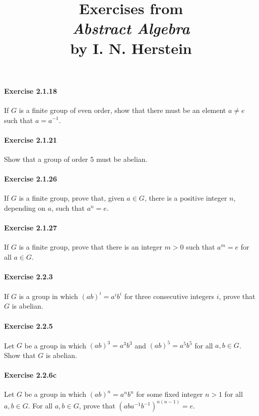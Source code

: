 \documentclass{article}
\title{\textbf{
Exercises from \\
\textit{Abstract Algebra} \\
by I. N. Herstein
}}
\date{}
\begin{document}
\maketitle

\paragraph{Exercise 2.1.18} If $G$ is a finite group of even order, show that there must be an element $a \neq e$ such that $a=a^{-1}$.

\paragraph{Exercise 2.1.21} Show that a group of order 5 must be abelian.

\paragraph{Exercise 2.1.26} If $G$ is a finite group, prove that, given $a \in G$, there is a positive integer $n$, depending on $a$, such that $a^n = e$.

\paragraph{Exercise 2.1.27} If $G$ is a finite group, prove that there is an integer $m > 0$ such that $a^m = e$ for all $a \in G$.

\paragraph{Exercise 2.2.3} If $G$ is a group in which $(a b)^{i}=a^{i} b^{i}$ for three consecutive integers $i$, prove that $G$ is abelian.

\paragraph{Exercise 2.2.5} Let $G$ be a group in which $(a b)^{3}=a^{3} b^{3}$ and $(a b)^{5}=a^{5} b^{5}$ for all $a, b \in G$. Show that $G$ is abelian.

\paragraph{Exercise 2.2.6c} Let $G$ be a group in which $(a b)^{n}=a^{n} b^{n}$ for some fixed integer $n>1$ for all $a, b \in G$. For all $a, b \in G$, prove that $\left(a b a^{-1} b^{-1}\right)^{n(n-1)}=e$. 
\end{document}
